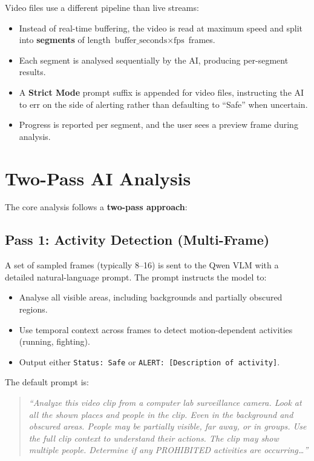 \documentclass[12pt,a4paper]{article}
\begin{document}
Video files use a different pipeline than live streams:

\begin{itemize}
    \item Instead of real-time buffering, the video is read at maximum speed and split into \textbf{segments} of length $\text{buffer\_seconds} \times \text{fps}$ frames.
    \item Each segment is analysed sequentially by the AI, producing per-segment results.
    \item A \textbf{Strict Mode} prompt suffix is appended for video files, instructing the AI to err on the side of alerting rather than defaulting to ``Safe'' when uncertain.
    \item Progress is reported per segment, and the user sees a preview frame during analysis.
\end{itemize}

\section{Two-Pass AI Analysis}

The core analysis follows a \textbf{two-pass approach}:

\subsection{Pass 1: Activity Detection (Multi-Frame)}

A set of sampled frames (typically 8--16) is sent to the Qwen VLM with a detailed natural-language prompt. The prompt instructs the model to:

\begin{itemize}[noitemsep]
    \item Analyse all visible areas, including backgrounds and partially obscured regions.
    \item Use temporal context across frames to detect motion-dependent activities (running, fighting).
    \item Output either \texttt{Status: Safe} or \texttt{ALERT: [Description of activity]}.
\end{itemize}

The default prompt is:

\begin{quote}
\small
\textit{``Analyze this video clip from a computer lab surveillance camera. Look at all the shown places and people in the clip. Even in the background and obscured areas. People may be partially visible, far away, or in groups. Use the full clip context to understand their actions. The clip may show multiple people. Determine if any PROHIBITED activities are occurring\ldots''}
\end{quote}
\end{document}
